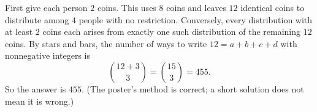 First give each person $2$ coins. This uses $8$ coins and leaves $12$ identical coins to distribute among $4$ people with no restriction. Conversely, every distribution with at least $2$ coins each arises from exactly one such distribution of the remaining $12$ coins. By stars and bars, the number of ways to write $12=a+b+c+d$ with nonnegative integers is
\[
\binom{12+3}{3}=\binom{15}{3}=455 .
\]
So the answer is $\boxed{455}$. (The poster's method is correct; a short solution does not mean it is wrong.)
